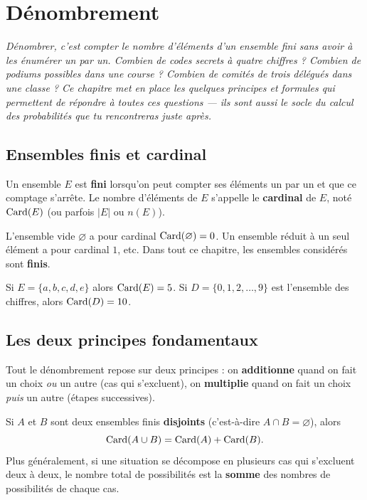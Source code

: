 \chapter{Dénombrement}
\textit{Dénombrer, c'est compter le nombre d'éléments d'un ensemble fini sans avoir
à les énumérer un par un. Combien de codes secrets à quatre chiffres ? Combien de
podiums possibles dans une course ? Combien de comités de trois délégués dans une
classe ? Ce chapitre met en place les quelques principes et formules qui permettent
de répondre à toutes ces questions — ils sont aussi le socle du calcul des
probabilités que tu rencontreras juste après.}

\section{Ensembles finis et cardinal}

\begin{definition}
Un ensemble $E$ est \textbf{fini} lorsqu'on peut compter ses éléments un par un et
que ce comptage s'arrête. Le nombre d'éléments de $E$ s'appelle le \textbf{cardinal}
de $E$, noté $\operatorname{Card}(E)$ (ou parfois $|E|$ ou $n(E)$).
\end{definition}

\begin{remarque}
L'ensemble vide $\varnothing$ a pour cardinal $\operatorname{Card}(\varnothing)=0$. Un ensemble
réduit à un seul élément a pour cardinal $1$, etc. Dans tout ce chapitre, les
ensembles considérés sont \textbf{finis}.
\end{remarque}

\begin{exemple}
Si $E=\{a,b,c,d,e\}$ alors $\operatorname{Card}(E)=5$. Si $D=\{0,1,2,\dots,9\}$ est l'ensemble des
chiffres, alors $\operatorname{Card}(D)=10$.
\end{exemple}

\section{Les deux principes fondamentaux}

Tout le dénombrement repose sur deux principes : on \textbf{additionne} quand on
fait un choix \emph{ou} un autre (cas qui s'excluent), on \textbf{multiplie} quand on
fait un choix \emph{puis} un autre (étapes successives).

\begin{theoreme}
Si $A$ et $B$ sont deux ensembles finis \textbf{disjoints} (c'est-à-dire
$A\cap B=\varnothing$), alors
\[ \operatorname{Card}(A\cup B)=\operatorname{Card}(A)+\operatorname{Card}(B). \]
Plus généralement, si une situation se décompose en plusieurs cas qui s'excluent
deux à deux, le nombre total de possibilités est la \textbf{somme} des nombres de
possibilités de chaque cas.
\end{theoreme}

